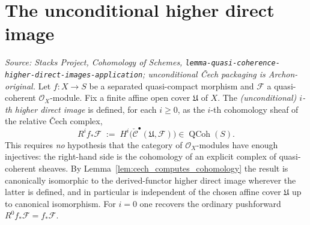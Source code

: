 
\section{The unconditional higher direct image}

\begin{definition}
  \label{def:cech_higher_direct_image}
  \textit{Source: Stacks Project, Cohomology of Schemes,
  \texttt{lemma-quasi-coherence-higher-direct-images-application}; unconditional
  {\v C}ech packaging is Archon-original.}
  Let \(f : X \to S\) be a separated quasi-compact morphism and \(\mathcal{F}\) a
  quasi-coherent \(\mathcal{O}_X\)-module. Fix a finite affine open cover
  \(\mathfrak{U}\) of \(X\). The \emph{(unconditional) \(i\)-th higher direct
  image} is defined, for each \(i \geq 0\), as the \(i\)-th cohomology sheaf of the
  relative {\v C}ech complex,
  \[
    R^i f_*\mathcal{F} \;:=\;
      H^i\bigl(\check{\mathcal{C}}^\bullet(\mathfrak{U}, \mathcal{F})\bigr)
      \in \operatorname{QCoh}(S).
  \]
  This requires \emph{no} hypothesis that the category of \(\mathcal{O}_X\)-modules
  have enough injectives: the right-hand side is the cohomology of an explicit
  complex of quasi-coherent sheaves. By
  Lemma~\ref{lem:cech_computes_cohomology} the result is canonically isomorphic to
  the derived-functor higher direct image wherever the latter is defined, and in
  particular is independent of the chosen affine cover \(\mathfrak{U}\) up to
  canonical isomorphism. For \(i = 0\) one recovers the ordinary
  pushforward \(R^0 f_*\mathcal{F} = f_*\mathcal{F}\).
\end{definition}

